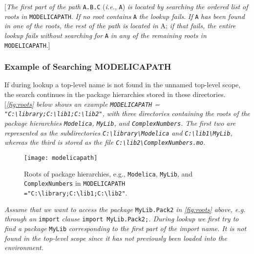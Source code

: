 {[}\emph{The first part of the path} \lstinline[basicstyle=\ttfamily]!A.B.C! (\emph{i.e.}, \lstinline[basicstyle=\ttfamily]!A!) \emph{is
located by searching the ordered list of roots in} \lstinline[basicstyle=\ttfamily]!MODELICAPATH!.
\emph{If no root contains} \lstinline[basicstyle=\ttfamily]!A! \emph{the lookup fails}. \emph{If} \lstinline[basicstyle=\ttfamily]!A!
\emph{has been found in one of the roots, the rest of the path is
located in} A; \emph{if that fails, the entire lookup fails without
searching} \emph{for} \lstinline[basicstyle=\ttfamily]!A! \emph{in any of the remaining roots in}
\lstinline[basicstyle=\ttfamily]!MODELICAPATH!.{]}

\subsubsection{Example of Searching MODELICAPATH}

If during lookup a top-level name is not found in the unnamed top-level
scope, the search continues in the package hierarchies stored in these
directories. {[}\emph{\autoref{fig:roots} below shows an example \lstinline[basicstyle=\ttfamily]!MODELICAPATH! =
\lstinline[basicstyle=\ttfamily]!"C:\library;C:\lib1;C:\lib2"!,
with three directories containing the roots of the package hierarchies
\lstinline[basicstyle=\ttfamily]!Modelica!, \lstinline[basicstyle=\ttfamily]!MyLib!, and \lstinline[basicstyle=\ttfamily]!ComplexNumbers!. The first two are represented as
the subdirectories \lstinline[basicstyle=\ttfamily]!C:\library\Modelica! and
\lstinline[basicstyle=\ttfamily]!C:\lib1\MyLib!, whereas the third is stored
as the file \lstinline[basicstyle=\ttfamily]!C:\lib2\ComplexNumbers.mo!.}

\begin{figure}[H]
\caption{Roots of package hierarchies, e.g.,
\lstinline!Modelica!, \lstinline!MyLib!, and \lstinline!ComplexNumbers! in
\lstinline[basicstyle=\ttfamily]!MODELICAPATH ="C:\library;C:\lib1;C:\lib2"!.
\label{fig:roots}}
\texttt{[image: modelicapath]}
\end{figure}

\emph{Assume that we want to access the package} \lstinline[basicstyle=\ttfamily]!MyLib.Pack2! \emph{in
\autoref{fig:roots} above, e.g. through an} \lstinline[basicstyle=\ttfamily]!import! \emph{clause} 
\lstinline[basicstyle=\ttfamily]!import MyLib.Pack2;!\emph{. During lookup we first try to find a package} \lstinline[basicstyle=\ttfamily]!MyLib!
\emph{corresponding to the first part of the import name. It is not
found in the top-level scope since it has not previously been loaded
into the environment. }

